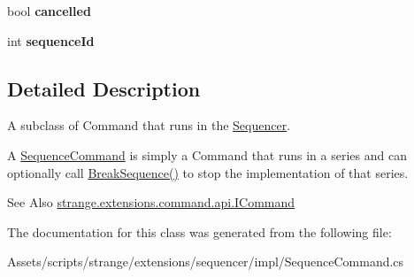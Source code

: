 \begin{DoxyCompactItemize}
\item 
\hypertarget{classstrange_1_1extensions_1_1sequencer_1_1impl_1_1_sequence_command_a262d277af1d177fbb31cc07b81a6ff08}{bool {\bfseries cancelled}}\label{classstrange_1_1extensions_1_1sequencer_1_1impl_1_1_sequence_command_a262d277af1d177fbb31cc07b81a6ff08}

\item 
\hypertarget{classstrange_1_1extensions_1_1sequencer_1_1impl_1_1_sequence_command_a3b018839ded619cbdddfa687fb123874}{int {\bfseries sequence\-Id}}\label{classstrange_1_1extensions_1_1sequencer_1_1impl_1_1_sequence_command_a3b018839ded619cbdddfa687fb123874}

\end{DoxyCompactItemize}


\subsection{Detailed Description}
A subclass of Command that runs in the \hyperlink{classstrange_1_1extensions_1_1sequencer_1_1impl_1_1_sequencer}{Sequencer}. 

A \hyperlink{classstrange_1_1extensions_1_1sequencer_1_1impl_1_1_sequence_command}{Sequence\-Command} is simply a Command that runs in a series and can optionally call {\ttfamily \hyperlink{classstrange_1_1extensions_1_1sequencer_1_1impl_1_1_sequence_command_a3eb9670db9fd5b07b7004be5acb9e266}{Break\-Sequence()}} to stop the implementation of that series.

\begin{DoxySeeAlso}{See Also}
\hyperlink{interfacestrange_1_1extensions_1_1command_1_1api_1_1_i_command}{strange.\-extensions.\-command.\-api.\-I\-Command} 
\end{DoxySeeAlso}


The documentation for this class was generated from the following file\-:\begin{DoxyCompactItemize}
\item 
Assets/scripts/strange/extensions/sequencer/impl/Sequence\-Command.\-cs\end{DoxyCompactItemize}
